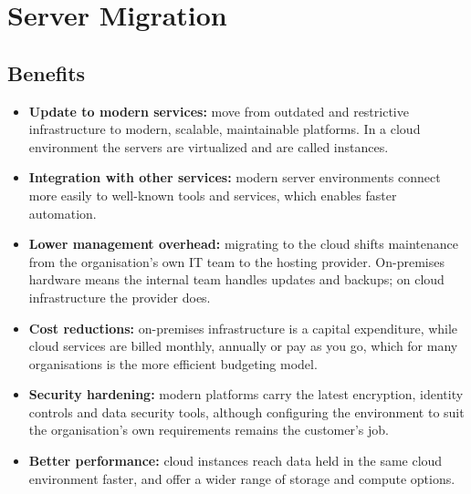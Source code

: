 \documentclass[11pt,a4paper]{article}
\begin{document}
\newpage
\section{Server Migration}



\subsection{Benefits}

\begin{itemize}\itemsep4pt
  \item \textbf{Update to modern services:} move from outdated and restrictive infrastructure
        to modern, scalable, maintainable platforms. In a cloud environment the servers are
        virtualized and are called instances.
  \item \textbf{Integration with other services:} modern server environments connect more
        easily to well-known tools and services, which enables faster automation.
  \item \textbf{Lower management overhead:} migrating to the cloud shifts maintenance from the
        organisation's own IT team to the hosting provider. On-premises hardware means the
        internal team handles updates and backups; on cloud infrastructure the provider does.
  \item \textbf{Cost reductions:} on-premises infrastructure is a capital expenditure, while
        cloud services are billed monthly, annually or pay as you go, which for many
        organisations is the more efficient budgeting model.
  \item \textbf{Security hardening:} modern platforms carry the latest encryption, identity
        controls and data security tools, although configuring the environment to suit the
        organisation's own requirements remains the customer's job.
  \item \textbf{Better performance:} cloud instances reach data held in the same cloud
        environment faster, and offer a wider range of storage and compute options.
\end{itemize}
\end{document}
